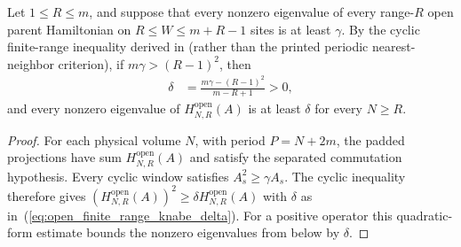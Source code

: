 \begin{lemma}
    \label{thm:open_finite_range_knabe_gap}
    \leanok
    Let $1\leq R\leq m$, and suppose that every nonzero eigenvalue of
    every range-$R$ open parent Hamiltonian on $R\leq W\leq m+R-1$ sites is
    at least $\gamma$. By the cyclic finite-range inequality
    derived in \cite{gap:knabe88_finite_range_coefficient} (rather than the
    printed periodic nearest-neighbor criterion), if $m\gamma>(R-1)^2$, then
    \begin{align}
        \delta & =\frac{m\gamma-(R-1)^2}{m-R+1}>0,
        \label{eq:open_finite_range_knabe_delta}
    \end{align}
    and every nonzero eigenvalue of $H^{\mathrm{open}}_{N,R}(A)$ is at
    least $\delta$ for every $N\geq R$.
\end{lemma}
\begin{proof}\leanok
    For each physical volume $N$, with period $P=N+2m$,
    the padded projections have sum $H^{\mathrm{open}}_{N,R}(A)$ and
    satisfy the separated commutation hypothesis. Every cyclic window
    satisfies $A_s^2\geq\gamma A_s$. The cyclic inequality therefore gives
    $(H^{\mathrm{open}}_{N,R}(A))^2\geq\delta H^{\mathrm{open}}_{N,R}(A)$
    with $\delta$ as in~(\ref{eq:open_finite_range_knabe_delta}).
    For a positive operator this quadratic-form estimate bounds the nonzero
    eigenvalues from below by $\delta$.
\end{proof}

